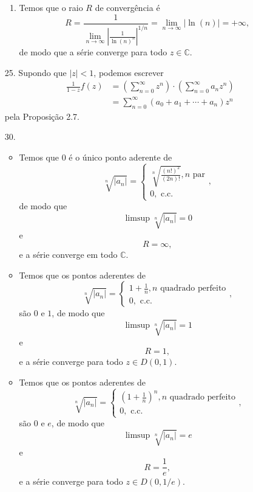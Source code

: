 \documentclass[12pt,a4paper]{article}
\begin{document}
\begin{enumerate}
\begin{enumerate}
			\item Temos que o raio $R$ de convergência é
			$$
			R = \frac{1}{\lim\limits_{n\to\infty} |\frac{1}{\ln(n)^n}|^{1/n} } = \lim\limits_{n\to\infty} |\ln(n)| = +\infty, 
			$$
			de modo que a série converge para todo $z\in\mathbb{C}$.
			\end{enumerate} 
		
		\item[25.] Supondo que $|z|<1$, podemos escrever
		\begin{align*}
		\frac{1}{1-z}f(z) &= \left(\sum_{n=0}^{\infty}z^n\right)\cdot\left(\sum_{n=0}^{\infty}a_nz^n\right) \\
		&= \sum_{n=0}^{\infty}(a_0+a_1+\cdots+a_n)z^n
		\end{align*}
		pela Proposição 2.7.
		
		\item[30.] 
		\begin{itemize}
			\item Temos que $0$ é o único ponto aderente de 
			$$
			\sqrt[n]{|a_n|} = \begin{cases}
			\displaystyle{\sqrt[n]{\frac{(n!)^2}{(2n)!}}}, n \text{ par} \\
			0, \text{ c.c.}
			\end{cases},
			$$
			de modo que 
			$$
			\limsup\sqrt[n]{|a_n|} = 0
			$$
			e
			$$
			R = \infty,
			$$
			e a série converge em todo $\mathbb{C}$.
			
			\item Temos que os pontos aderentes de 
			$$
			\sqrt[n]{|a_n|} = \begin{cases}
			\displaystyle{1+\frac{1}{n}}, n \text{ quadrado perfeito} \\
			0, \text{ c.c.}
			\end{cases},
			$$
			são $0$ e $1$, de modo que 
			$$
			\limsup\sqrt[n]{|a_n|} = 1
			$$
			e
			$$
			R = 1,
			$$
			e a série converge para todo $z\in D(0,1)$.
			
			\item Temos que os pontos aderentes de 
			$$
			\sqrt[n]{|a_n|} = \begin{cases}
			\displaystyle{\left(1+\frac{1}{n}\right)^n}, n \text{ quadrado perfeito} \\
			0, \text{ c.c.}
			\end{cases},
			$$
			são $0$ e $e$, de modo que 
			$$
			\limsup\sqrt[n]{|a_n|} = e
			$$
			e
			$$
			R = \frac{1}{e},
			$$
			e a série converge para todo $z\in D(0,1/e)$.
		\end{itemize}
	\end{enumerate}
\end{document}
